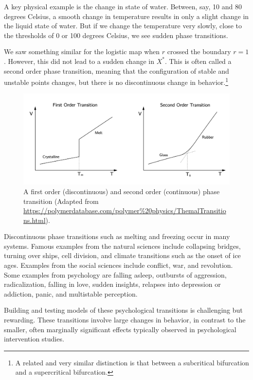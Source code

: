 \documentclass[
  a4paper,
  DIV=11,
  numbers=noendperiod,
  oneside]{scrreprt}
\begin{document}
A key physical example is the change in state of water. Between, say, 10
and 80 degrees Celsius, a smooth change in temperature results in only a
slight change in the liquid state of water. But if we change the
temperature very slowly, close to the thresholds of 0 or 100 degrees
Celsius, we see sudden phase transitions.

We saw something similar for the logistic map when \(r\) crossed the
boundary \(r = 1\). However, this did not lead to a sudden change in
\(X^{*}\). This is often called a second order phase transition, meaning
that the configuration of stable and unstable points changes, but there
is no discontinuous change in behavior.\footnote{A related and very
  similar distinction is that between a subcritical bifurcation and a
  supercritical bifurcation.}

\begin{figure}

{\centering \includegraphics{media/ch3/ch3-01__figure13.png}

}

\caption{\label{fig-ch3-img1-old-13}A first order (discontinuous) and
second order (continuous) phase transition (Adapted from
\url{https://polymerdatabase.com/polymer\%20physics/ThemalTransitions.html}).}

\end{figure}

Discontinuous phase transitions such as melting and freezing occur in
many systems. Famous examples from the natural sciences include
collapsing bridges, turning over ships, cell division, and climate
transitions such as the onset of ice ages. Examples from the social
sciences include conflict, war, and revolution. Some examples from
psychology are falling asleep, outbursts of aggression, radicalization,
falling in love, sudden insights, relapses into depression or addiction,
panic, and multistable perception.

Building and testing models of these psychological transitions is
challenging but rewarding. These transitions involve large changes in
behavior, in contrast to the smaller, often marginally significant
effects typically observed in psychological intervention studies.
\end{document}
